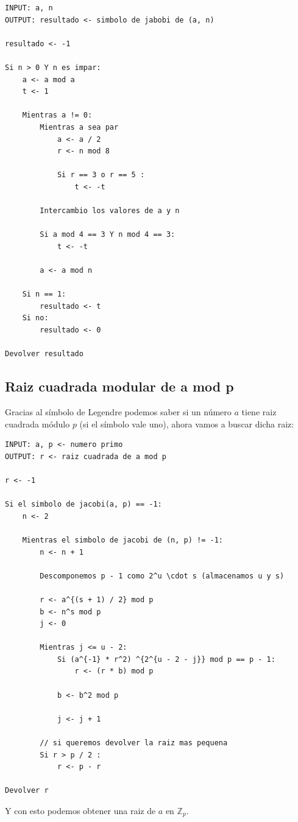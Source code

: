 \documentclass[12pt, spanish]{article}
\begin{document}
\begin{lstlisting}[caption={Símbolo de Jacobi}]
INPUT: a, n
OUTPUT: resultado <- simbolo de jabobi de (a, n)

resultado <- -1

Si n > 0 Y n es impar:
	a <- a mod a
	t <- 1

	Mientras a != 0:
		Mientras a sea par
			a <- a / 2
			r <- n mod 8

			Si r == 3 o r == 5 :
				t <- -t

		Intercambio los valores de a y n

		Si a mod 4 == 3 Y n mod 4 == 3:
			t <- -t

		a <- a mod n

	Si n == 1:
		resultado <- t
	Si no:
		resultado <- 0

Devolver resultado
\end{lstlisting}

\subsection{Raiz cuadrada modular de a mod p}

Gracias al símbolo de Legendre podemos saber si un número $a$ tiene raiz cuadrada módulo $p$ (si el símbolo vale uno), ahora vamos a buscar dicha raiz:


\begin{lstlisting}[caption={Algoritmo para obtener la raiz cuadrada modular}]
INPUT: a, p <- numero primo
OUTPUT: r <- raiz cuadrada de a mod p

r <- -1

Si el simbolo de jacobi(a, p) == -1:
	n <- 2

	Mientras el simbolo de jacobi de (n, p) != -1:
		n <- n + 1

		Descomponemos p - 1 como 2^u \cdot s (almacenamos u y s)

		r <- a^{(s + 1) / 2} mod p
		b <- n^s mod p
		j <- 0

		Mientras j <= u - 2:
			Si (a^{-1} * r^2) ^{2^{u - 2 - j}} mod p == p - 1:
				r <- (r * b) mod p

			b <- b^2 mod p

			j <- j + 1

		// si queremos devolver la raiz mas pequena
		Si r > p / 2 :
			r <- p - r

Devolver r
\end{lstlisting}

Y con esto podemos obtener una raiz de $a$ en $\mathbb{Z}_p$.
\end{document}
